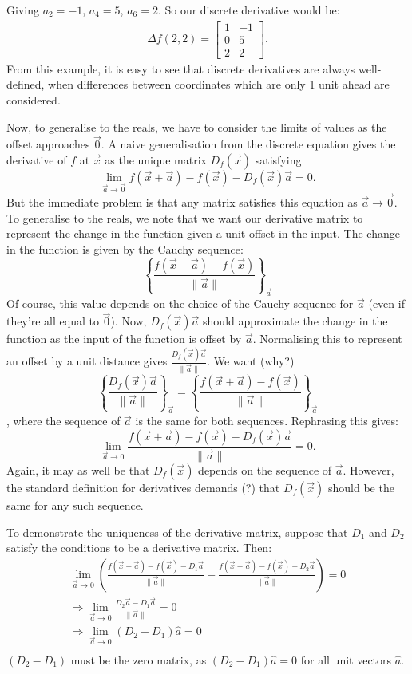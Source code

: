 \documentclass{article}
\theoremstyle{definition}
\begin{document}
Giving $a_2=-1$, $a_4=5$, $a_6=2$. So our discrete derivative would be:
\begin{align*}
	\Delta f(2,2)=\begin{bmatrix}1&-1\\0&5\\2&2\end{bmatrix}.
\end{align*}
From this example, it is easy to see that discrete derivatives are always well-defined, when differences between coordinates which are only 1 unit ahead are considered.\par

Now, to generalise to the reals, we have to consider the limits of values as the offset approaches $\vec0$. A naive generalisation from the discrete equation gives the derivative of $f$ at $\vec x$ as the unique matrix $D_f(\vec x)$ satisfying
\[\lim\limits_{\vec a\rightarrow\vec0}f(\vec x+\vec a)-f(\vec x)-D_f(\vec x)\vec a=0.\]
But the immediate problem is that any matrix satisfies this equation as $\vec a\rightarrow\vec0$.
To generalise to the reals, we note that we want our derivative matrix to represent the change in the function given a unit offset in the input.
The change in the function is given by the Cauchy sequence:
\[\left\{\frac{f(\vec x+\vec a)-f(\vec x)}{\lVert\vec a\rVert}\right\}_{\vec a}\]
Of course, this value depends on the choice of the Cauchy sequence for $\vec a$ (even if they're all equal to $\vec0$). Now, $D_f(\vec x)\vec a$ should approximate the change in the function as the input of the function is offset by $\vec a$. Normalising this to represent an offset by a unit distance gives $\frac{D_f(\vec x)\vec a}{\lVert\vec a\rVert}$. We want (why?)
\[\left\{\frac{D_f(\vec x)\vec a}{\lVert\vec a\rVert}\right\}_{\vec a}=\left\{\frac{f(\vec x+\vec a)-f(\vec x)}{\lVert\vec a\rVert}\right\}_{\vec a}\]
, where the sequence of $\vec a$ is the same for both sequences. Rephrasing this gives:
\[\lim\limits_{\vec a\rightarrow0}\frac{f(\vec x+\vec a)-f(\vec x)-D_f(\vec x)\vec a}{\lVert\vec a\rVert}=0.\]
Again, it may as well be that $D_f(\vec x)$ depends on the sequence of $\vec a$. However, the standard definition for derivatives demands (?) that $D_f(\vec x)$ should be the same for any such sequence.\par
To demonstrate the uniqueness of the derivative matrix, suppose that $D_1$ and $D_2$ satisfy the conditions to be a derivative matrix. Then:
\begin{align*}
	\lim\limits_{\vec a\rightarrow0}\left(\frac{f(\vec x+\vec a)-f(\vec x)-D_1\vec a}{\lVert\vec a\rVert}-\frac{f(\vec x+\vec a)-f(\vec x)-D_2\vec a}{\lVert\vec a\rVert}\right)=0\\
	\Rightarrow\lim\limits_{\vec a\rightarrow0}\frac{D_2\vec a-D_1\vec a}{\lVert\vec a\rVert}=0\\
	\Rightarrow\lim\limits_{\vec a\rightarrow0}(D_2-D_1)\hat{a}=0\\
\end{align*}
$(D_2-D_1)$ must be the zero matrix, as $(D_2-D_1)\hat{a}=0$ for all unit vectors $\hat{a}$.
\end{document}
